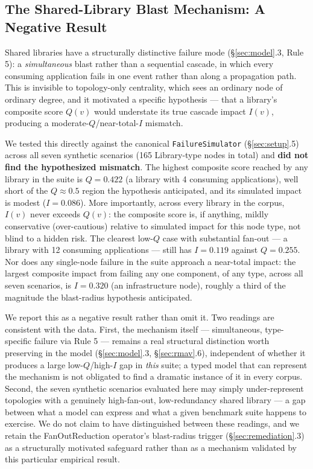 \documentclass[review]{elsarticle}
\begin{document}
\subsection{The Shared-Library Blast Mechanism: A Negative Result}

Shared libraries have a structurally distinctive failure mode (\S\ref{sec:model}.3, Rule 5): a
\emph{simultaneous} blast rather than a sequential cascade, in which every consuming application
fails in one event rather than along a propagation path. This is invisible to topology-only
centrality, which sees an ordinary node of ordinary degree, and it motivated a specific hypothesis
--- that a library's composite score $Q(v)$ would understate its true cascade impact $I(v)$,
producing a moderate-$Q$/near-total-$I$ mismatch.

We tested this directly against the canonical \texttt{FailureSimulator} (\S\ref{sec:setup}.5) across
all seven synthetic scenarios (165 Library-type nodes in total) and \textbf{did not find the
hypothesized mismatch}. The highest composite score reached by any library in the suite is $Q =
0.422$ (a library with 4 consuming applications), well short of the $Q \approx 0.5$ region the
hypothesis anticipated, and its simulated impact is modest ($I = 0.086$). More importantly, across
every library in the corpus, $I(v)$ never exceeds $Q(v)$: the composite score is, if anything,
mildly conservative (over-cautious) relative to simulated impact for this node type, not blind to a
hidden risk. The clearest low-$Q$ case with substantial fan-out --- a library with 12 consuming
applications --- still has $I = 0.119$ against $Q = 0.255$. Nor does any single-node failure in the
suite approach a near-total impact: the largest composite impact from failing any one component, of
any type, across all seven scenarios, is $I = 0.320$ (an infrastructure node), roughly a third of
the magnitude the blast-radius hypothesis anticipated.

We report this as a negative result rather than omit it. Two readings are consistent with the data.
First, the mechanism itself --- simultaneous, type-specific failure via Rule 5 --- remains a real
structural distinction worth preserving in the model (\S\ref{sec:model}.3, \S\ref{sec:rmav}.6),
independent of whether it produces a large low-$Q$/high-$I$ gap in \emph{this} suite; a typed model
that can represent the mechanism is not obligated to find a dramatic instance of it in every corpus.
Second, the seven synthetic scenarios evaluated here may simply under-represent topologies with a
genuinely high-fan-out, low-redundancy shared library --- a gap between what a model can express and
what a given benchmark suite happens to exercise. We do not claim to have distinguished between
these readings, and we retain the FanOutReduction operator's blast-radius trigger
(\S\ref{sec:remediation}.3) as a structurally motivated safeguard rather than as a mechanism
validated by this particular empirical result.
\end{document}
